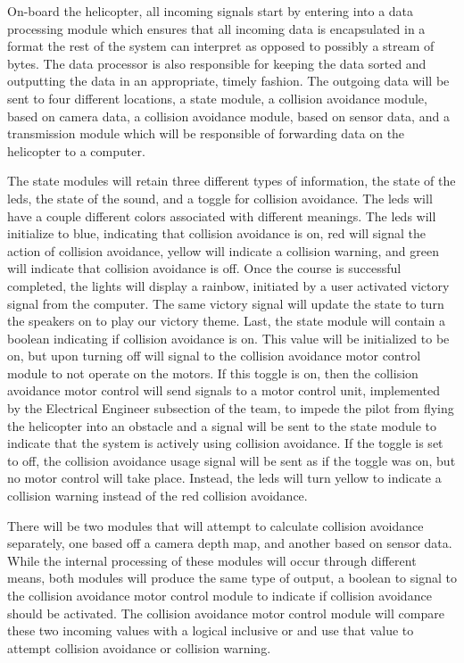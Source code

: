 \documentclass[onecolumn, oneside, letterpaper, draftclsnofoot, 10pt, compsoc]{IEEEtran}
\begin{document}
On-board the helicopter, all incoming signals start by entering into a data processing module which ensures that all incoming data is encapsulated in a format the rest of the system can interpret as opposed to possibly a stream of bytes. The data processor is also responsible for keeping the data sorted and outputting the data in an appropriate, timely fashion. The outgoing data will be sent to four different locations, a state module, a collision avoidance module, based on camera data, a collision avoidance module, based on sensor data, and a transmission module which will be responsible of forwarding data on the helicopter to a computer.

The state modules will retain three different types of information, the state of the leds, the state of the sound, and a toggle for collision avoidance. The leds will have a couple different colors associated with different meanings. The leds will initialize to blue, indicating that collision avoidance is on, red will signal the action of collision avoidance, yellow will indicate a collision warning, and green will indicate that collision avoidance is off. Once the course is successful completed, the lights will display a rainbow, initiated by a user activated victory signal from the computer. The same victory signal will update the state to turn the speakers on to play our victory theme. Last, the state module will contain a boolean indicating if collision avoidance is on. This value will be initialized to be on, but upon turning off will signal to the collision avoidance motor control module to not operate on the motors. If this toggle is on, then the collision avoidance motor control will send signals to a motor control unit, implemented by the Electrical Engineer subsection of the team, to impede the pilot from flying the helicopter into an obstacle and a signal will be sent to the state module to indicate that the system is actively using collision avoidance. If the toggle is set to off, the collision avoidance usage signal will be sent as if the toggle was on, but no motor control will take place. Instead, the leds will turn yellow to indicate a collision warning instead of the red collision avoidance.

There will be two modules that will attempt to calculate collision avoidance separately, one based off a camera depth map, and another based on sensor data. While the internal processing of these modules will occur through different means, both modules will produce the same type of output, a boolean to signal to the collision avoidance motor control module to indicate if collision avoidance should be activated. The collision avoidance motor control module will compare these two incoming values with a logical inclusive or and use that value to attempt collision avoidance or collision warning.
\end{document}
